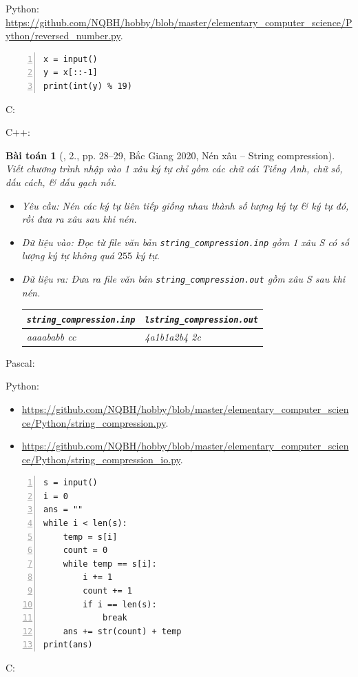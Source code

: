 \documentclass{article}
\newtheorem{baitoan}{Bài toán}
\begin{document}
Python: \url{https://github.com/NQBH/hobby/blob/master/elementary_computer_science/Python/reversed_number.py}.
\begin{Verbatim}[numbers=left,xleftmargin=5mm]
x = input()
y = x[::-1]
print(int(y) % 19)
\end{Verbatim}
C:

C++:

\begin{baitoan}[\cite{VietSTEM2021}, 2., pp. 28--29, Bắc Giang 2020, Nén xâu -- String compression]
	Viết chương trình nhập vào 1 xâu ký tự chỉ gồm các chữ cái Tiếng Anh, chữ số, dấu cách, \& dấu gạch nối.
	\begin{itemize}
		\item {\sf Yêu cầu:} Nén các ký tự liên tiếp giống nhau thành số lượng ký tự \& ký tự đó, rồi đưa ra xâu sau khi nén.
		\item {\sf Dữ liệu vào:} Đọc từ file văn bản \verb|string_compression.inp| gồm 1 xâu S có số lượng ký tự không quá $255$ ký tự.
		\item {\sf Dữ liệu ra:} Đưa ra file văn bản \verb|string_compression.out| gồm xâu S sau khi nén.
		\begin{table}[H]
			\centering
			\begin{tabular}{|l|l|}
				\hline
				\verb|string_compression.inp| & \verb|lstring_compression.out| \\
				\hline
				aaaababb    cc & 4a1b1a2b4 2c \\
				\hline
			\end{tabular}
		\end{table}
	\end{itemize}
\end{baitoan}
\noindent Pascal:

Python:
\begin{itemize}
    \item \url{https://github.com/NQBH/hobby/blob/master/elementary_computer_science/Python/string_compression.py}.
    \item \url{https://github.com/NQBH/hobby/blob/master/elementary_computer_science/Python/string_compression_io.py}.
\end{itemize}
\begin{Verbatim}[numbers=left,xleftmargin=5mm]
s = input()
i = 0
ans = ""
while i < len(s):
    temp = s[i]
    count = 0
    while temp == s[i]:
        i += 1
        count += 1
        if i == len(s):
            break
    ans += str(count) + temp
print(ans)
\end{Verbatim}
C:
\end{document}
